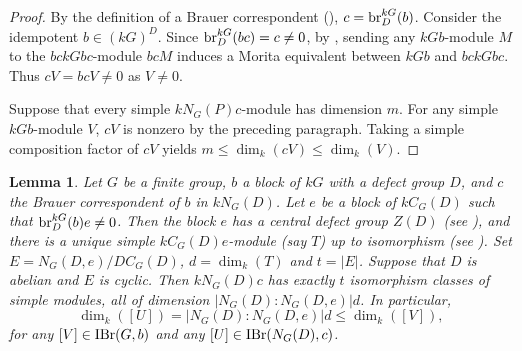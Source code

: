 \documentclass[preprint,12pt,3p]{elsarticle}
\newtheorem{lemma}[theorem]{Lemma}
\def\IBr{{\rm IBr}}
\def\br{{\rm br}}
\begin{document}
\begin{proof}
By the definition of a Brauer correspondent (\cite[Theorem 6.7.1]{Lin18b}), $c=\br_D^{kG}(b)$. Consider the idempotent $b\in (kG)^D$. Since $\br_D^{kG}(bc)=c\neq 0$, by \cite[Theorem 6.4.6]{Lin18b}, sending any $kGb$-module $M$ to the $bckGbc$-module $bcM$ induces a Morita equivalent between $kGb$ and $bckGbc$. Thus $cV=bcV\neq0$ as $V\neq 0$.

	
Suppose that every simple $k N_G(P)c$-module has dimension $m$. For any simple $kGb$-module $V$, $cV$ is nonzero by the preceding paragraph. Taking a simple composition factor of $cV$ yields $m \leq \dim_k(cV) \leq \dim_k(V)$.
\end{proof}



\begin{lemma}\label{lem:dimension}
Let $G$ be a finite group, $b$ a block of $kG$ with a defect group $D$, and $c$ the Brauer correspondent of $b$ in $kN_G(D)$. Let $e$ be a block of $kC_G(D)$ such that $\br_D^{kG}(b)e\neq 0$. Then the block $e$ has a central defect group $Z(D)$ (see \cite[Corollary 6.3.10]{Lin18b}), and there is a unique simple $kC_G(D)e$-module (say $T$) up to isomorphism (see \cite[Proposition 6.6.5]{Lin18b}). Set $E=N_G(D,e)/DC_G(D)$, $d =\dim_k(T)$ and $t=|E|$. Suppose that $D$ is abelian and $E$ is cyclic. Then $kN_G(D)c$ has exactly $t$ isomorphism classes of simple modules, all of dimension $|N_G(D):N_G(D,e)|d$. In particular, $$\dim_k([U]) = |N_G(D):N_G(D,e)|d \leq \dim_k([V]),$$
for any $[V] \in \IBr(G,b)$ and any $[U] \in \IBr(N_G(D),c)$.
\end{lemma}
\end{document}
